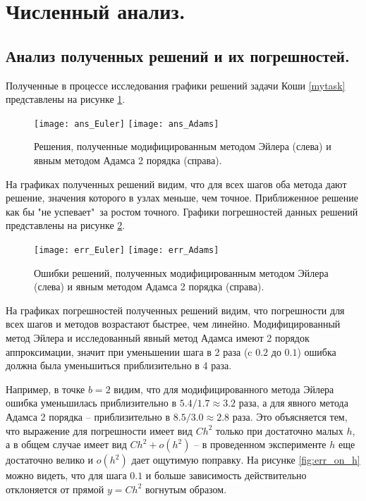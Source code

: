 \documentclass[a4paper, 12pt]{article}
\begin{document}
	\section{Численный анализ.}
	
	\subsection{Анализ полученных решений и их погрешностей.}
	
	Полученные в процессе исследования графики решений задачи Коши \eqref{mytask} представлены на рисунке \ref{fig:ans}.
	
	\begin{figure}[H]\centering
		\texttt{[image: ans\_Euler]}
		\texttt{[image: ans\_Adams]}
		\caption{Решения, полученные модифицированным методом Эйлера (слева) и явным методом Адамса 2 порядка (справа).}\label{fig:ans}
	\end{figure}

	На графиках полученных решений видим, что для всех шагов оба метода дают решение, значения которого в узлах меньше, чем точное. Приближенное решение как бы "не успевает"\ за ростом точного. Графики погрешностей данных решений представлены на рисунке \ref{fig:err}.
	
	\begin{figure}[H]\centering
		\texttt{[image: err\_Euler]}
		\texttt{[image: err\_Adams]}
		\caption{Ошибки решений, полученных модифицированным методом Эйлера (слева) и явным методом Адамса 2 порядка (справа).}\label{fig:err}
	\end{figure}

	На графиках погрешностей полученных решений видим, что погрешности для всех шагов и методов возрастают быстрее, чем линейно. Модифицированный метод Эйлера и исследованный явный метод Адамса имеют 2 порядок аппроксимации, значит при уменьшении шага в 2 раза (c $0.2$ до $0.1$) ошибка должна была уменьшиться приблизительно в 4 раза. 
	
	Например, в точке $b=2$ видим, что для модифицированного метода Эйлера ошибка уменьшилась приблизительно в $5.4/1.7\approx3.2$ раза, а для явного метода Адамса 2 порядка -- приблизительно в $8.5/3.0\approx2.8$ раза. Это объясняется тем, что выражение для погрешности имеет вид $Ch^2$ только при достаточно малых $h$, а в общем случае имеет вид $Ch^2 + o(h^2)$ -- в проведенном эксперименте $h$ еще достаточно велико и $o(h^2)$ дает ощутимую поправку. На рисунке \ref{fig:err_on_h} можно видеть, что для шага $0.1$ и больше зависимость действительно отклоняется от прямой $y=Ch^2$ вогнутым образом.
	
\end{document}
